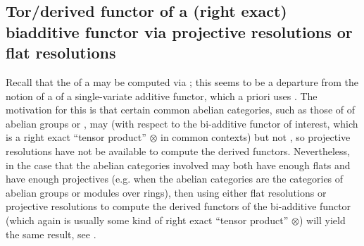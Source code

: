 



\subsection{Tor/derived functor of a (right exact) biadditive functor via projective resolutions or flat resolutions}

Recall that the  of a  may be computed via ; this seems to be a departure from the notion of a  of a single-variate  additive functor, which a priori uses  . The motivation for this is that certain common abelian categories, such as those of  of abelian groups or , may  (with respect to the bi-additive functor of interest, which is a right exact ``tensor product'' $\otimes$ in common contexts) but not , so projective resolutions have not be available to compute the derived functors. Nevertheless, in the case that the abelian categories involved may both have enough flats and have enough projectives (e.g. when the abelian categories are the categories of abelian groups or modules over rings), then using either flat resolutions or projective resolutions to compute the derived functors of the bi-additive functor (which again is usually some kind of right exact ``tensor product'' $\otimes$) will yield the same result, see . 


